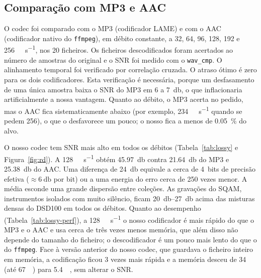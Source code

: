 \documentclass[a4paper,11pt]{article}
\newcommand{\prog}[1]{\texttt{#1}}
\begin{document}
\subsection{Comparação com MP3 e AAC}
\label{sec:lossy-cmp}
O codec foi comparado com o MP3 (codificador LAME) e com o AAC (codificador nativo
do \texttt{ffmpeg}), em débito constante, a 32, 64, 96, 128, 192 e
\SI{256}{\kilo\bit\per\second}, nos 20 ficheiros. Os ficheiros descodificados
foram acertados ao número de amostras do original e o SNR foi medido com o
\prog{wav\_cmp}. O alinhamento temporal foi verificado por correlação cruzada. O
atraso ótimo é zero para os dois codificadores. Esta verificação é necessária,
porque um desfasamento de uma única amostra baixa o SNR do MP3 em 6 a
\SI{7}{\decibel}, o que inflacionaria artificialmente a nossa vantagem. Quanto ao
débito, o MP3 acerta no pedido, mas o AAC fica sistematicamente abaixo (por
exemplo, \SI{234}{\kilo\bit\per\second} quando se pedem 256), o que o desfavorece
um pouco; o nosso fica a menos de \SI{0,05}{\percent} do alvo.

O nosso codec tem SNR mais alto em todos os débitos
(Tabela~\ref{tab:lossy} e Figura~\ref{fig:rd}). A \SI{128}{\kilo\bit\per\second}
obtém \SI{45,97}{\decibel} contra \SI{21,64}{\decibel} do MP3 e \SI{25,38}{\decibel} do
AAC. Uma diferença de \SI{24}{\decibel} equivale a cerca de 4~bits de precisão
efetiva ($\approx\SI{6}{\decibel}$ por bit) ou a uma energia do erro cerca de 250
vezes menor. A média esconde uma grande dispersão entre coleções. As gravações do
SQAM, instrumentos isolados com muito silêncio, ficam \SIrange{20}{27}{\decibel}
acima das misturas densas do DSD100 em todos os débitos. Quanto ao desempenho
(Tabela~\ref{tab:lossy-perf}), a \SI{128}{\kilo\bit\per\second} o nosso codificador
é mais rápido do que o MP3 e o AAC e usa cerca de três vezes menos memória, que
além disso não depende do tamanho do ficheiro; o descodificador é um pouco mais
lento do que o do \texttt{ffmpeg}. Face à versão anterior do nosso codec, que
guardava o ficheiro inteiro em memória, a codificação ficou 3 vezes mais rápida e
a memória desceu de \SI{34}{\mebi\byte} (até \SI{67}{\mebi\byte}) para
\SI{5,4}{\mebi\byte}, sem alterar o SNR.
\end{document}
